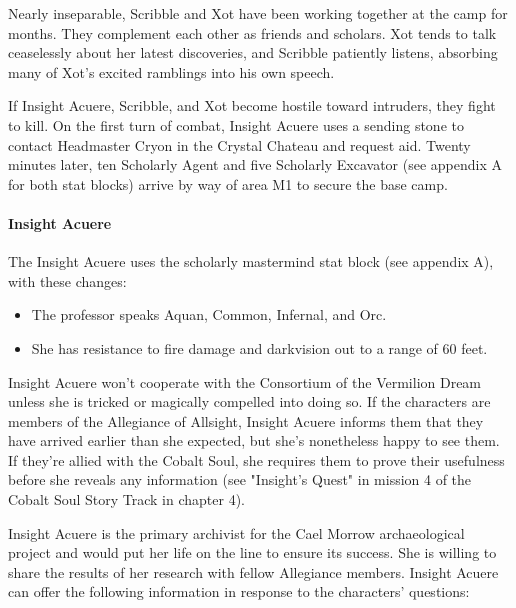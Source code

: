\documentclass[10pt,a4paper,twoside,bg=print,twocolumn,openany,nodeprecatedcode]{dndbook}
\begin{document}
Nearly inseparable, Scribble and Xot have been working together at the camp for months. They complement each other as friends and scholars. Xot tends to talk ceaselessly about her latest discoveries, and Scribble patiently listens, absorbing many of Xot's excited ramblings into his own speech.

If Insight Acuere, Scribble, and Xot become hostile toward intruders, they fight to kill. On the first turn of combat, Insight Acuere uses a sending stone to contact Headmaster Cryon in the Crystal Chateau and request aid. Twenty minutes later, ten Scholarly Agent and five Scholarly Excavator (see appendix A for both stat blocks) arrive by way of area M1 to secure the base camp.

\paragraph{Insight Acuere}
The Insight Acuere uses the scholarly mastermind stat block (see appendix A), with these changes:

\begin{itemize}
\item The professor speaks Aquan, Common, Infernal, and Orc.
\item She has resistance to fire damage and darkvision out to a range of 60 feet.
\end{itemize}

Insight Acuere won't cooperate with the Consortium of the Vermilion Dream unless she is tricked or magically compelled into doing so. If the characters are members of the Allegiance of Allsight, Insight Acuere informs them that they have arrived earlier than she expected, but she's nonetheless happy to see them. If they're allied with the Cobalt Soul, she requires them to prove their usefulness before she reveals any information (see "Insight's Quest" in mission 4 of the Cobalt Soul Story Track in chapter 4).

Insight Acuere is the primary archivist for the Cael Morrow archaeological project and would put her life on the line to ensure its success. She is willing to share the results of her research with fellow Allegiance members. Insight Acuere can offer the following information in response to the characters' questions:
\end{document}

